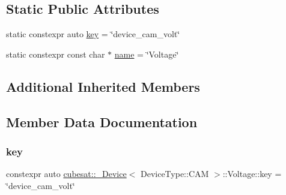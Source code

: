 \subsection*{Static Public Attributes}
\begin{DoxyCompactItemize}
\item 
static constexpr auto \hyperlink{structcubesat_1_1__Device_3_01DeviceType_1_1CAM_01_4_1_1Voltage_a2c341ac567860c77f6b09d262cb9fe78}{key} = \char`\"{}device\+\_\+cam\+\_\+volt\char`\"{}
\item 
static constexpr const char $\ast$ \hyperlink{structcubesat_1_1__Device_3_01DeviceType_1_1CAM_01_4_1_1Voltage_ad552e724b2a9ade405ab624362298583}{name} = \char`\"{}Voltage\char`\"{}
\end{DoxyCompactItemize}
\subsection*{Additional Inherited Members}


\subsection{Member Data Documentation}
\mbox{\label{structcubesat_1_1__Device_3_01DeviceType_1_1CAM_01_4_1_1Voltage_a2c341ac567860c77f6b09d262cb9fe78}} 
\subsubsection{\texorpdfstring{key}{key}}
{\footnotesize\ttfamily constexpr auto \hyperlink{structcubesat_1_1__Device}{cubesat\+::\+\_\+\+Device}$<$ Device\+Type\+::\+C\+AM $>$\+::Voltage\+::key = \char`\"{}device\+\_\+cam\+\_\+volt\char`\"{}\hspace{0.3cm}{\ttfamily [static]}}

\mbox{\label{structcubesat_1_1__Device_3_01DeviceType_1_1CAM_01_4_1_1Voltage_ad552e724b2a9ade405ab624362298583}} 

